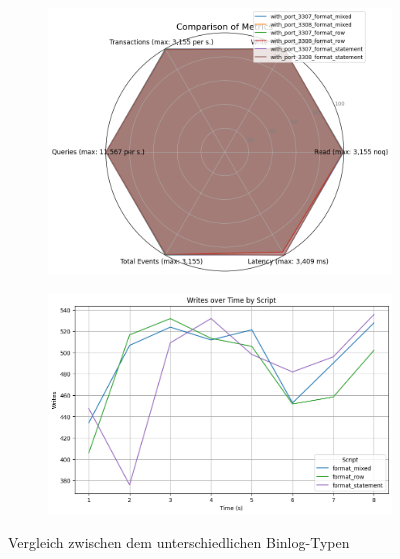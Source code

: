 \begin{figure}[H]
  \centering
  \begin{subfigure}[t]{0.48\textwidth}
    \includegraphics[width=\textwidth]{PNGs/Script/Replication/replication-format-change/statistics}
  \end{subfigure}
  \hfill
  \begin{subfigure}[t]{0.48\textwidth}
    \includegraphics[width=\textwidth]{PNGs/Script/Replication/replication-format-change/Writes}
  \end{subfigure}
  \vspace{-8pt}
  \caption[Replikation: Unterschiedlichen Binlog-Typen]{Vergleich zwischen dem unterschiedlichen Binlog-Typen }
  \label{fig:replication-format-change}
\end{figure}
\vspace{-20pt}

